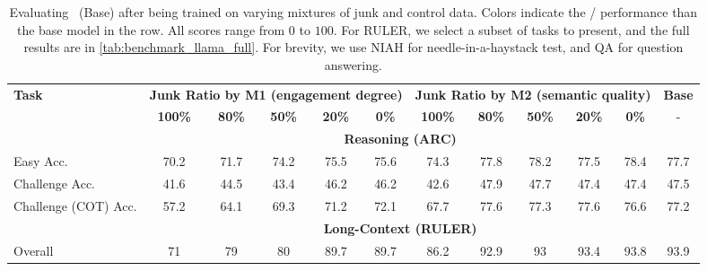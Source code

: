 \begin{table}[t]
\centering
\vspace{-0.1in}
\scriptsize
\caption{Evaluating \llama\ (Base) after being trained on varying mixtures of junk and control data. Colors indicate the / performance than the base model in the row. 
       All scores range from $0$ to $100$. For RULER, we select a subset of tasks to present, and the full results are in \cref{tab:benchmark_llama_full}. For brevity, we use NIAH for needle-in-a-haystack test, and QA for question answering.
       }
\label{tab:merged_all_grouped_colored}
\setlength{\tabcolsep}{6pt}
\vspace{-0.1in}
\begin{tabular}{l|ccccc|ccccc|c}
\toprule
\multirow{2}{*}{\textbf{Task}}  & \multicolumn{5}{c|}{\textbf{Junk Ratio by M1 (engagement degree)}} & \multicolumn{5}{c|}{\textbf{Junk Ratio by M2 (semantic quality)}} & \textbf{Base} \\
 & \textbf{100\%} & \textbf{80\%} & \textbf{50\%} & \textbf{20\%} & \textbf{0\%} & \textbf{100\%} & \textbf{80\%} & \textbf{50\%} & \textbf{20\%} & \textbf{0\%} & - \\
\midrule
&\multicolumn{10}{c}{\textbf{Reasoning (ARC)}}\\
Easy Acc. & \cellcolor{myred!90} 70.2 & \cellcolor{myred!72} 71.7 & \cellcolor{myred!42} 74.2 & \cellcolor{myred!26} 75.5 & \cellcolor{myred!25} 75.6 & \cellcolor{myred!40} 74.3 & \cellcolor{royalblue!2} 77.8 & \cellcolor{royalblue!7} 78.2 & \cellcolor{myred!2} 77.5 & \cellcolor{royalblue!9} 78.4 & 77.7 \\
Challenge Acc. & \cellcolor{myred!90} 41.6 & \cellcolor{myred!46} 44.5 & \cellcolor{myred!63} 43.4 & \cellcolor{myred!20} 46.2 & \cellcolor{myred!21} 46.2 & \cellcolor{myred!76} 42.6 & \cellcolor{royalblue!5} 47.9 & \cellcolor{royalblue!3} 47.7 & \cellcolor{myred!1} 47.4 & \cellcolor{myred!3} 47.4 & 47.5 \\
Challenge (COT) Acc. & \cellcolor{myred!90} 57.2 & \cellcolor{myred!59} 64.1 & \cellcolor{myred!36} 69.3 & \cellcolor{myred!27} 71.2 & \cellcolor{myred!23} 72.1 & \cellcolor{myred!43} 67.7 & \cellcolor{royalblue!2} 77.6 & 77.3 & \cellcolor{royalblue!2} 77.6 & \cellcolor{myred!3} 76.6 & 77.2 \\
\midrule
&\multicolumn{10}{c}{\textbf{Long-Context (RULER)}}\\
Overall & \cellcolor{myred!90} 71 & \cellcolor{myred!59} 79 & \cellcolor{myred!55} 80 & \cellcolor{myred!17} 89.7 & \cellcolor{myred!17} 89.7 & \cellcolor{myred!30} 86.2 & \cellcolor{myred!4} 92.9 & \cellcolor{myred!4} 93 & \cellcolor{myred!2} 93.4 & 93.8 & 93.9 \\

\end{tabular}
\end{table}

